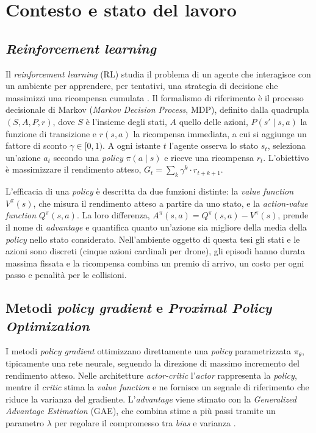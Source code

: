 \documentclass[12pt,a4paper,twoside]{report}
\newcommand{\parencite}[1]{\citep{#1}}
\begin{document}
\chapter{Contesto e stato del lavoro}
\label{chap:contesto}

\section{\emph{Reinforcement learning}}
\label{sec:rl}

Il \emph{reinforcement learning} (RL) studia il problema di un agente che interagisce con un ambiente per apprendere, per tentativi, una strategia di decisione che massimizzi una ricompensa cumulata \parencite{sutton2018}. Il formalismo di riferimento è il processo decisionale di Markov (\emph{Markov Decision Process}, MDP), definito dalla quadrupla $(S, A, P, r)$, dove $S$ è l'insieme degli stati, $A$ quello delle azioni, $P(s' \mid s, a)$ la funzione di transizione e $r(s, a)$ la ricompensa immediata, a cui si aggiunge un fattore di sconto $\gamma \in [0, 1)$. A ogni istante $t$ l'agente osserva lo stato $s_t$, seleziona un'azione $a_t$ secondo una \emph{policy} $\pi(a \mid s)$ e riceve una ricompensa $r_t$. L'obiettivo è massimizzare il rendimento atteso, $G_t = \sum_k \gamma^k \cdot r_{t+k+1}$.

L'efficacia di una \emph{policy} è descritta da due funzioni distinte: la \emph{value function} $V^\pi(s)$, che misura il rendimento atteso a partire da uno stato, e la \emph{action-value function} $Q^\pi(s, a)$. La loro differenza, $A^\pi(s, a) = Q^\pi(s, a) - V^\pi(s)$, prende il nome di \emph{advantage} e quantifica quanto un'azione sia migliore della media della \emph{policy} nello stato considerato. Nell'ambiente oggetto di questa tesi gli stati e le azioni sono discreti (cinque azioni cardinali per drone), gli episodi hanno durata massima fissata e la ricompensa combina un premio di arrivo, un costo per ogni passo e penalità per le collisioni.
\newpage
\section{Metodi \emph{policy gradient} e \emph{Proximal Policy Optimization}}
\label{sec:ppo}

I metodi \emph{policy gradient} ottimizzano direttamente una \emph{policy} parametrizzata $\pi_\theta$, tipicamente una rete neurale, seguendo la direzione di massimo incremento del rendimento atteso. Nelle architetture \emph{actor-critic} l'\emph{actor} rappresenta la \emph{policy}, mentre il \emph{critic} stima la \emph{value function} e ne fornisce un segnale di riferimento che riduce la varianza del gradiente. L'\emph{advantage} viene stimato con la \emph{Generalized Advantage Estimation} (GAE), che combina stime a più passi tramite un parametro $\lambda$ per regolare il compromesso tra \emph{bias} e varianza \parencite{schulman2016}.
\end{document}
